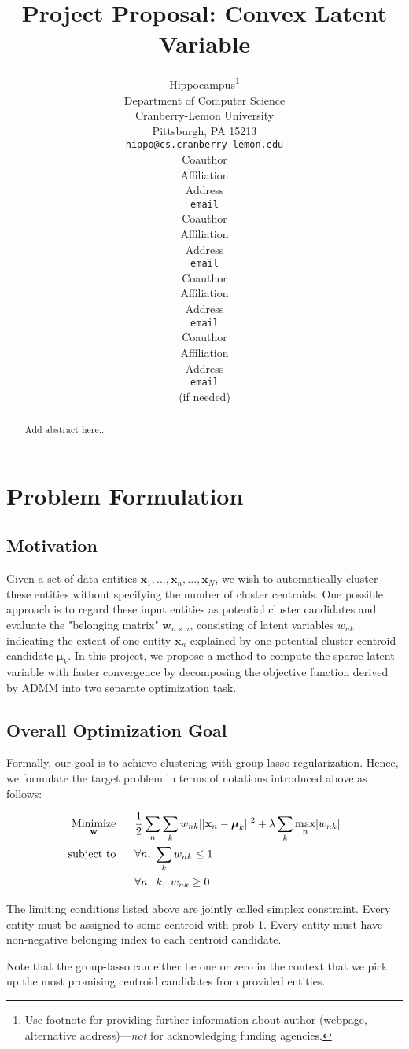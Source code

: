\documentclass{article} %
\title{Project Proposal: Convex Latent Variable}
\author{
Hippocampus\thanks{ Use footnote for providing further information
about author (webpage, alternative address)---\emph{not} for acknowledging
funding agencies.} \\
Department of Computer Science\\
Cranberry-Lemon University\\
Pittsburgh, PA 15213 \\
\texttt{hippo@cs.cranberry-lemon.edu} \\
\And
Coauthor \\
Affiliation \\
Address \\
\texttt{email} \\
\AND
Coauthor \\
Affiliation \\
Address \\
\texttt{email} \\
\And
Coauthor \\
Affiliation \\
Address \\
\texttt{email} \\
\And
Coauthor \\
Affiliation \\
Address \\
\texttt{email} \\
(if needed)\\
}
\newcommand{\LTwoNorm}[1]{||#1||^{2}}
\newcommand{\sumn}{\sum_{n}}
\newcommand{\sumk}{\sum_{k}}
\newcommand{\wnk}{w_{nk}}
\newcommand{\w}{\mathbf{w}}
\newcommand{\wnbyn}{\mathbf{w}_{n\times n}}
\newcommand{\x}[1]{\mathbf{x}_{#1}}
\newcommand{\xn}{\mathbf{x}_n}
\newcommand{\muk}{\boldsymbol{\mu}_k}
\newcommand{\maxn}{ \underset{n}{\text{max}} }
\newcommand{\minimize}[1]{ \underset{#1}{\text{Minimize}} }
\newcommand{\subjectto}{ \text{subject to} }
\newcommand{\hs}{\hspace*{0.6cm}}
\begin{document}
\maketitle

\begin{abstract}
    Add abstract here..
\end{abstract}

\section{Problem Formulation}
\subsection{Motivation}
Given a set of data entities $\x{1}, ..., \xn, ..., \x{N} $, we wish to
automatically cluster these entities without specifying the number of cluster
centroids. One possible approach is to regard these input entities as
potential cluster candidates and evaluate the "belonging matrix" $\wnbyn$, consisting
of latent variables $\wnk$ indicating the extent of one entity $\xn$ explained
by one potential cluster centroid candidate $\muk$. In this project, we
propose a method to compute the sparse latent variable with faster
convergence by decomposing the objective function derived by ADMM into two
separate optimization task. 


\subsection{Overall Optimization Goal}
Formally, our goal is to achieve clustering with group-lasso regularization.
Hence, we formulate the target problem in terms of notations introduced above
as follows:  

 \begin{align}
  \minimize{\w} 
  \hs & \frac{1}{2} \sumn \sumk \wnk \LTwoNorm{\xn - \muk}  %
        + \lambda \sumk \maxn | \wnk |  \\ %
  \subjectto  
  \hs & \forall n,\ \sumk \wnk \leq 1 \\
  \hs & \forall n,\ k,\ \wnk \geq 0
 \end{align}

The limiting conditions listed above are jointly called simplex constraint.
Every entity must be assigned to some centroid with prob 1.
Every entity must have non-negative belonging index to each centroid candidate.

Note that the group-lasso can either be one or zero in the context that we
pick up the most promising centroid candidates from provided entities. 
\end{document}
